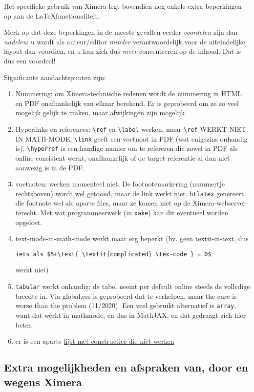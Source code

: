 \documentclass{ximera}
\begin{document}
Het specifieke gebruik van Ximera legt bovendien nog enkele extra beperkingen op aan de \LaTeX functionaliteit. 

Merk op dat deze beperkingen in de meeste gevallen eerder \textit{voordelen} zijn dan \textit{nadelen}: u wordt als auteur/editor \textit{minder} verantwoordelijk voor de uiteindelijke layout dan voordien, en u kan zich dus \textit{meer} concentreren op de inhoud. Dat is dus een voordeel!

Significante aandachtspunten zijn:

\begin{enumerate}
	\item Nummering: om Ximera-technische redenen wordt de nummering in HTML en PDF onafhankelijk van elkaar berekend. Er is geprobeerd om ze zo veel mogelijk gelijk te maken, maar afwijkingen zijn mogelijk.
	\item Hyperlinks en  references: \verb|\ref| en \verb|\label| werken, maar \verb|\ref| WERKT NIET IN MATH-MODE; \verb|\link| geeft een voetnoot in PDF (wat enigszins onhandig is). \verb|\hyperref| is een handige manier om te refereren die zowel in PDF als online consistent werkt, onafhankelijk of de target-referentie al dan niet aanwezig is in de PDF.
	\item voetnoten: werken momenteel niet. De footnotemarkering (nummertje rechtsboven) wordt wel getoond, maar de link werkt niet. \verb|htlatex| genereert die footnote wel als aparte files, maar ze komen niet op de Ximera-webserver terecht. Met wat programmeerwerk (in \verb|xake|) kan dit eventueel worden opgelost.
	\item text-mode-in-math-mode werkt maar erg beperkt (bv. geen textit-in-text, dus 
    
    \verb|iets als $5+\text{ \textit{complicated} \tex-code } = 0$ | 
    
    werkt niet)  
	\item \verb|tabular| werkt onhandig: de tabel neemt per default online steeds de volledige breedte in. Via global.css is geprobeerd dat te verhelpen, maar the cure is worse than the problem (11/2020). Een veel gebruikt alternatief is \verb|array|, want dat werkt in mathmode, en dus in MathJAX, en dat gedraagt zich hier beter.

    \item er is een aparte \hyperref[xim:failcase]{lijst met constructies die niet werken}

\end{enumerate}

\subsection{Extra mogelijkheden en afspraken van, door en wegens Ximera}
\end{document}
